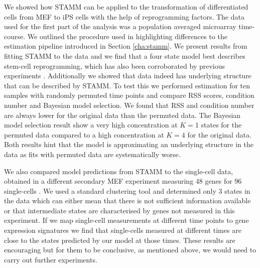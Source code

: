 We showed how STAMM can be applied to the transformation of differentiated cells from MEF to iPS cells with the help of reprogramming factors. The data used for the first part of the analysis was a population averaged microarray time-course. We outlined the procedure used in \cite{Armond:2013} highlighting differences to the estimation pipeline introduced in Section \ref{cha:stamm}. We present results from fitting STAMM to the data and we find that a four state model best describes stem-cell reprogramming, which has also been corroborated by previous experiments \cite{SamavarchiTehrani:2010cp}. Additionally we showed that data indeed has underlying  structure that can be described by STAMM. To test this we performed estimation for ten samples with randomly permuted time points and compare RSS scores, condition number and Bayesian model selection. We found that RSS and condition number are always lower for the original data than the permuted data. The Bayesian model selection result show a very high concentration at $K=1$ states for the permuted data compared to a high concentration at $K=4$ for the original data. Both results hint that the model is approximating an underlying structure in the data as fits with permuted data are systematically worse.

We also compared model predictions from STAMM to the single-cell data, obtained in a different secondary MEF experiment measuring $48$ genes for $96$ single-cells \citep{Buganim:2012hp}. We used a standard clustering tool and determined only $3$ states in the data which can either mean that there is not sufficient information available or that intermediate states are characterised by genes not measured in this experiment. If we map single-cell measurements at different time points to gene expression signatures we find that single-cells measured at different times are close to the states predicted by our model at those times. These results are encouraging but for them to be conclusive, as mentioned above, we would need to carry out further experiments.


